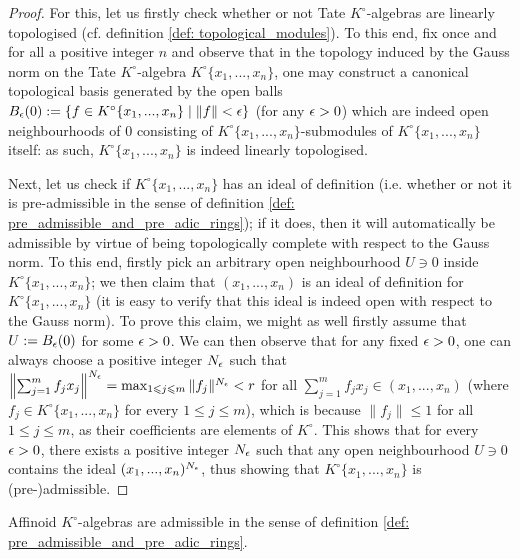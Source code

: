                 \begin{proof}
                    For this, let us firstly check whether or not Tate $K^{\circ}$-algebras are linearly topologised (cf. definition \ref{def: topological_modules}). To this end, fix once and for all a positive integer $n$ and observe that in the topology induced by the Gauss norm on the Tate $K^{\circ}$-algebra $K^{\circ}\{x_1, ..., x_n\}$, one may construct a canonical topological basis generated by the open balls $B_{\epsilon}(0) := \{f \in K^{\circ}\{x_1, ..., x_n\} \mid \|f\| < \epsilon\}$ (for any $\epsilon > 0$) which are indeed open neighbourhoods of $0$ consisting of $K^{\circ}\{x_1, ..., x_n\}$-submodules of $K^{\circ}\{x_1, ..., x_n\}$ itself: as such, $K^{\circ}\{x_1, ..., x_n\}$ is indeed linearly topologised. 
                
                    Next, let us check if $K^{\circ}\{x_1, ..., x_n\}$ has an ideal of definition (i.e. whether or not it is pre-admissible in the sense of definition \ref{def: pre_admissible_and_pre_adic_rings}); if it does, then it will automatically be admissible by virtue of being topologically complete with respect to the Gauss norm.  To this end, firstly pick an arbitrary open neighbourhood $U \ni 0$ inside $K^{\circ}\{x_1, ..., x_n\}$; we then claim that $(x_1, ..., x_n)$ is an ideal of definition for $K^{\circ}\{x_1, ..., x_n\}$ (it is easy to verify that this ideal is indeed open with respect to the Gauss norm). To prove this claim, we might as well firstly assume that $U := B_{\epsilon}(0)$ for some $\epsilon > 0$. We can then observe that for any fixed $\epsilon > 0$, one can always choose a positive integer $N_{\epsilon}$ such that $\left\| \sum_{j = 1}^m f_j x_j \right\|^{N_{\epsilon}} = \max_{1 \leqslant j \leqslant m} \|f_j\|^{N_{\epsilon}} < r$ for all $\sum_{j = 1}^m f_j x_j \in (x_1, ..., x_n)$ (where $f_j \in K^{\circ}\{x_1, ..., x_n\}$ for every $1 \leq j \leq m$), which is because $\|f_j\| \leq 1$ for all $1 \leq j \leq m$, as their coefficients are elements of $K^{\circ}$. This shows that for every $\epsilon > 0$, there exists a positive integer $N_{\epsilon}$ such that any open neighbourhood $U \ni 0$ contains the ideal $(x_1, ..., x_n)^{N_{\epsilon}}$, thus showing that $K^{\circ}\{x_1, ..., x_n\}$ is (pre-)admissible. 
                \end{proof}
            \begin{corollary} \label{coro: affinoid_algebras_over_valuation_rings_are_topologically_pre_admissible}
                Affinoid $K^{\circ}$-algebras are admissible in the sense of definition \ref{def: pre_admissible_and_pre_adic_rings}.
            \end{corollary}
